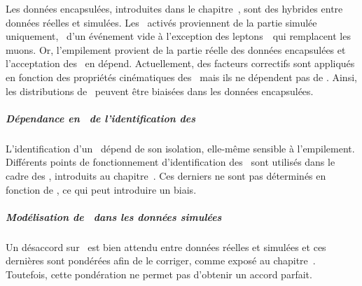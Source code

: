 {Les données encapsulées,
introduites dans le chapitre~,
sont des hybrides entre données réelles et simulées.
Les \HLTpaths\ activés proviennent de la partie simulée uniquement,
\ie\ d'un événement vide à l'exception des leptons~\tau\ qui remplacent les muons.
Or, l'empilement provient de la partie réelle des données encapsulées
et l'acceptation des \HLTpaths\ en dépend.
Actuellement,
des facteurs correctifs sont appliqués en fonction des propriétés cinématiques des \tau\
mais ils ne dépendent pas de \Npu.
Ainsi, les distributions de \Npu\ peuvent être biaisées dans les données encapsulées.
\subparagraph{Dépendance en \Npu\ de l'identification des \tauh}
L'identification d'un \tauh\ dépend de son isolation,
elle-même sensible à l'empilement.
Différents points de fonctionnement
d'identification des \tauh\ sont utilisés dans le cadre des \fakefactors,
introduits au chapitre~\refChHTT.
Ces derniers ne sont pas déterminés en fonction de \Npu,
ce qui peut introduire un biais.
\subparagraph{Modélisation de \Npu\ dans les données simulées}
Un désaccord sur \Npu\ est bien attendu entre données réelles et simulées
et ces dernières sont pondérées afin de le corriger, comme exposé au chapitre~.
Toutefois, cette pondération ne permet pas d'obtenir un accord parfait.

\def\EMBFFchoice{emb_ff}

}{
}